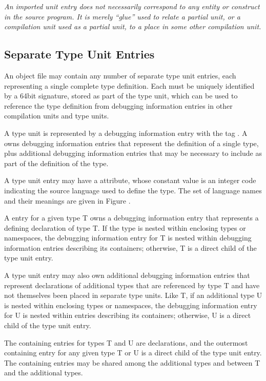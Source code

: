 \textit{An imported unit entry does not necessarily correspond to
any entity or construct in the source program. It is merely
“glue” used to relate a partial unit, or a compilation
unit used as a partial unit, to a place in some other
compilation unit.}

\subsection{Separate Type Unit Entries}
\label{chap:separatetypeunitentries}
An object file may contain any number of separate type
unit entries, each representing a single complete type
definition. 
Each  must be uniquely identified by
a 64\dash bit signature, stored as part of the type unit, which
can be used to reference the type definition from debugging
information entries in other compilation units and type units.

A type unit is represented by a debugging information entry
with the tag . 
A  owns debugging
information entries that represent the definition of a single
type, plus additional debugging information entries that may
be necessary to include as part of the definition of the type.

A type unit entry may have a 
 attribute, 
whose
constant value is an integer code indicating the source
language used to define the type. The set of language names
and their meanings are given in Figure .

A  entry for a given type T owns a debugging
information entry that represents a defining declaration
of type T. If the type is nested within enclosing types or
namespaces, the debugging information entry for T is nested
within debugging information entries describing its containers;
otherwise, T is a direct child of the type unit entry.

A type unit entry may also own additional debugging information
entries that represent declarations of additional types that
are referenced by type T and have not themselves been placed in
separate type units. Like T, if an additional type U is nested
within enclosing types or namespaces, the debugging information
entry for U is nested within entries describing its containers;
otherwise, U is a direct child of the type unit entry.

The containing entries for types T and U are declarations,
and the outermost containing entry for any given type T or
U is a direct child of the type unit entry. The containing
entries may be shared among the additional types and between
T and the additional types.

